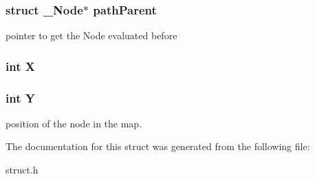 \subsubsection[{\texorpdfstring{path\+Parent}{pathParent}}]{\setlength{\rightskip}{0pt plus 5cm}struct {\bf \+\_\+\+Node}$\ast$ path\+Parent}\hypertarget{struct___node_a7d0cf1a91c4dd335673a79aa5db87d01}{}\label{struct___node_a7d0cf1a91c4dd335673a79aa5db87d01}
pointer to get the Node evaluated before 
\subsubsection[{\texorpdfstring{X}{X}}]{\setlength{\rightskip}{0pt plus 5cm}int X}\hypertarget{struct___node_a80c0944640e62d3ed6c5419c1bcc0c88}{}\label{struct___node_a80c0944640e62d3ed6c5419c1bcc0c88}
\subsubsection[{\texorpdfstring{Y}{Y}}]{\setlength{\rightskip}{0pt plus 5cm}int Y}\hypertarget{struct___node_aa482c4cc86a24474e4fb19b5b5978778}{}\label{struct___node_aa482c4cc86a24474e4fb19b5b5978778}
position of the node in the map. 

The documentation for this struct was generated from the following file\+:\begin{DoxyCompactItemize}
\item 
struct.\+h\end{DoxyCompactItemize}
